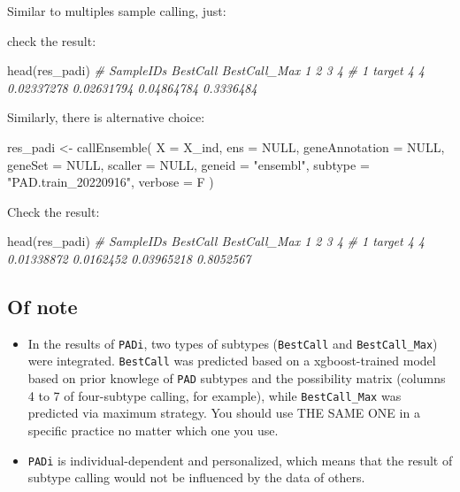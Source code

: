 \documentclass[
  12pt,
]{book}
\newenvironment{Shaded}{\begin{snugshade}}{\end{snugshade}}
\newcommand{\AttributeTok}[1]{\textcolor[rgb]{0.77,0.63,0.00}{#1}}
\newcommand{\CommentTok}[1]{\textcolor[rgb]{0.56,0.35,0.01}{\textit{#1}}}
\newcommand{\ConstantTok}[1]{\textcolor[rgb]{0.00,0.00,0.00}{#1}}
\newcommand{\FunctionTok}[1]{\textcolor[rgb]{0.00,0.00,0.00}{#1}}
\newcommand{\NormalTok}[1]{#1}
\newcommand{\OtherTok}[1]{\textcolor[rgb]{0.56,0.35,0.01}{#1}}
\newcommand{\StringTok}[1]{\textcolor[rgb]{0.31,0.60,0.02}{#1}}
\begin{document}
Similar to multiples sample calling, just:

check the result:

\begin{Shaded}
\begin{Highlighting}[]
\FunctionTok{head}\NormalTok{(res\_padi)}
\CommentTok{\#   SampleIDs BestCall BestCall\_Max          1          2          3         4}
\CommentTok{\# 1    target        4            4 0.02337278 0.02631794 0.04864784 0.3336484}
\end{Highlighting}
\end{Shaded}

Similarly, there is alternative choice:

\begin{Shaded}
\begin{Highlighting}[]
\NormalTok{res\_padi }\OtherTok{\textless{}{-}} \FunctionTok{callEnsemble}\NormalTok{(}
    \AttributeTok{X =}\NormalTok{ X\_ind,}
    \AttributeTok{ens =} \ConstantTok{NULL}\NormalTok{,}
    \AttributeTok{geneAnnotation =} \ConstantTok{NULL}\NormalTok{,}
    \AttributeTok{geneSet =} \ConstantTok{NULL}\NormalTok{,}
    \AttributeTok{scaller =} \ConstantTok{NULL}\NormalTok{,}
    \AttributeTok{geneid =} \StringTok{"ensembl"}\NormalTok{,}
    \AttributeTok{subtype =} \StringTok{"PAD.train\_20220916"}\NormalTok{,}
    \AttributeTok{verbose =}\NormalTok{ F}
\NormalTok{  )}
\end{Highlighting}
\end{Shaded}

Check the result:

\begin{Shaded}
\begin{Highlighting}[]
\FunctionTok{head}\NormalTok{(res\_padi)}
\CommentTok{\#   SampleIDs BestCall BestCall\_Max          1         2          3         4}
\CommentTok{\# 1    target        4            4 0.01338872 0.0162452 0.03965218 0.8052567}
\end{Highlighting}
\end{Shaded}

\hypertarget{of-note-1}{%
\subsection{Of note}\label{of-note-1}}

\begin{itemize}
\item
  In the results of \texttt{PADi}, two types of subtypes (\texttt{BestCall} and \texttt{BestCall\_Max}) were integrated. \texttt{BestCall} was predicted based on a xgboost-trained model based on prior knowlege of \texttt{PAD} subtypes and the possibility matrix (columns 4 to 7 of four-subtype calling, for example), while \texttt{BestCall\_Max} was predicted via maximum strategy. You should use THE SAME ONE in a specific practice no matter which one you use.
\item
  \texttt{PADi} is individual-dependent and personalized, which means that the result of subtype calling would not be influenced by the data of others.
\end{itemize}
\end{document}
